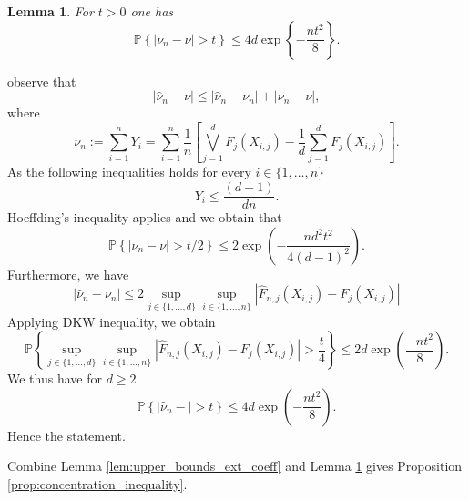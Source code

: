 \documentclass[11pt]{article}
\makeatletter
\newtheorem{lemma}{Lemma}
\theoremstyle{definition}
\renewenvironment{proof}[1][\proofname]{\par
\pushQED{\qed}%
\normalfont \topsep6\p@\@plus6\p@\relax
\trivlist
\item\relax
{\textbf{
#1\@addpunct{ }}}\hspace\labelsep\ignorespaces
}{%
\popQED\endtrivlist\@endpefalse
}
\makeatother
\begin{document}
	\begin{lemma}
		\label{lem:mado_concent}
		For $t > 0$ one has
		\begin{equation*}
			\mathbb{P}\left\{ |\nu_n - \nu | > t \right\} \leq 4 d \exp \left\{ -\frac{n t^2}{8} \right\}.
		\end{equation*}
	\end{lemma}
	\begin{proof}
		observe that
		\begin{equation*}
			|\hat{\nu}_n - \nu| \leq |\hat{\nu}_n - \nu_n | + |\nu_n - \nu |,
		\end{equation*}
		where
		\begin{equation*}
			\nu_n := \sum_{i=1}^n Y_i = \sum_{i=1}^n \frac{1}{n} \left[ \bigvee_{j=1}^d  F_j(X_{i,j})  - \frac{1}{d} \sum_{j=1}^d F_j(X_{i,j})  \right].
		\end{equation*}
		As the following inequalities holds for every $i \in \{1,\dots,n\}$
		\begin{equation*}
			Y_i \leq \frac{(d-1)}{dn}.
		\end{equation*}
		Hoeffding's inequality applies and we obtain that
		\begin{equation*}
			\mathbb{P}\left\{ |\nu_n - \nu | > t / 2 \right\} \leq 2 \exp\left( - \frac{n d^2 t^2}{4(d-1)^2} \right).
		\end{equation*}
		Furthermore, we have 
		\begin{equation*}
			|\hat{\nu}_n - \nu_n | \leq 2 \underset{j \in \{1,\dots,d\}}{\sup}\underset{i \in \{1,\dots,n\}}{\sup} \left|\hat{F}_{n,j}(X_{i,j})- F_{j}(X_{i,j}) \right|
		\end{equation*}
		Applying DKW inequality, we obtain
		\begin{equation*}
			\mathbb{P}\left\{ \underset{j \in \{1,\dots,d\}}{\sup}\underset{i \in \{1,\dots,n\}}{\sup} \left|\hat{F}_{n,j}(X_{i,j}) -  F_{j}(X_{i,j}) \right|> \frac{t}{4}\right\} \leq 2d \exp\left( \frac{-nt^2}{8} \right).
		\end{equation*}
		We thus have for $d \geq 2$
		\begin{equation*}
			\mathbb{P}\left\{ \left| \hat{\nu}_n-  \right| > t \right\} \leq 4d\exp\left(- \frac{n t^2}{8} \right).
		\end{equation*}
		Hence the statement.
	\end{proof}
	
	Combine Lemma \ref{lem:upper_bounds_ext_coeff} and Lemma \ref{lem:mado_concent} gives Proposition \ref{prop:concentration_inequality}.
	
\end{document}
